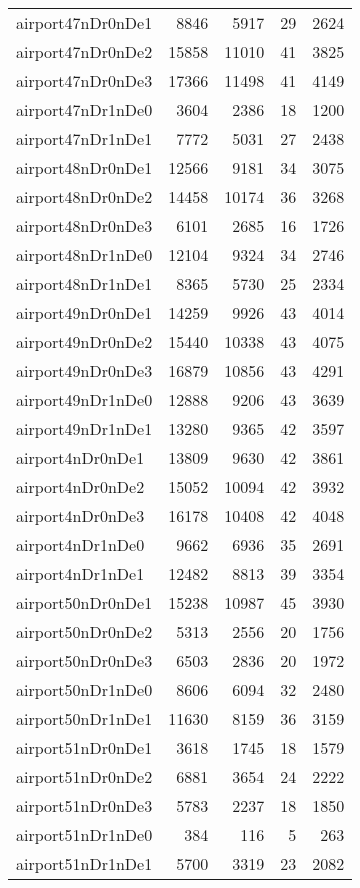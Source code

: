 \begin{longtable}{lrrrr}
airport47nDr0nDe1 & 8846 & 5917 & 29 & 2624 \\
airport47nDr0nDe2 & 15858 & 11010 & 41 & 3825 \\
airport47nDr0nDe3 & 17366 & 11498 & 41 & 4149 \\
airport47nDr1nDe0 & 3604 & 2386 & 18 & 1200 \\
airport47nDr1nDe1 & 7772 & 5031 & 27 & 2438 \\
airport48nDr0nDe1 & 12566 & 9181 & 34 & 3075 \\
airport48nDr0nDe2 & 14458 & 10174 & 36 & 3268 \\
airport48nDr0nDe3 & 6101 & 2685 & 16 & 1726 \\
airport48nDr1nDe0 & 12104 & 9324 & 34 & 2746 \\
airport48nDr1nDe1 & 8365 & 5730 & 25 & 2334 \\
airport49nDr0nDe1 & 14259 & 9926 & 43 & 4014 \\
airport49nDr0nDe2 & 15440 & 10338 & 43 & 4075 \\
airport49nDr0nDe3 & 16879 & 10856 & 43 & 4291 \\
airport49nDr1nDe0 & 12888 & 9206 & 43 & 3639 \\
airport49nDr1nDe1 & 13280 & 9365 & 42 & 3597 \\
airport4nDr0nDe1 & 13809 & 9630 & 42 & 3861 \\
airport4nDr0nDe2 & 15052 & 10094 & 42 & 3932 \\
airport4nDr0nDe3 & 16178 & 10408 & 42 & 4048 \\
airport4nDr1nDe0 & 9662 & 6936 & 35 & 2691 \\
airport4nDr1nDe1 & 12482 & 8813 & 39 & 3354 \\
airport50nDr0nDe1 & 15238 & 10987 & 45 & 3930 \\
airport50nDr0nDe2 & 5313 & 2556 & 20 & 1756 \\
airport50nDr0nDe3 & 6503 & 2836 & 20 & 1972 \\
airport50nDr1nDe0 & 8606 & 6094 & 32 & 2480 \\
airport50nDr1nDe1 & 11630 & 8159 & 36 & 3159 \\
airport51nDr0nDe1 & 3618 & 1745 & 18 & 1579 \\
airport51nDr0nDe2 & 6881 & 3654 & 24 & 2222 \\
airport51nDr0nDe3 & 5783 & 2237 & 18 & 1850 \\
airport51nDr1nDe0 & 384 & 116 & 5 & 263 \\
airport51nDr1nDe1 & 5700 & 3319 & 23 & 2082 \\

\end{longtable}
